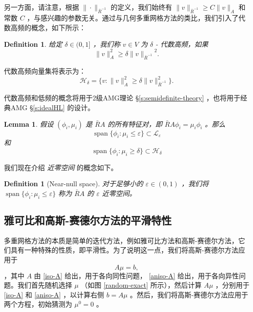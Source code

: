 \documentclass[12pt]{acta_2011xz}
\newcommand{\Tnorm}[1]{\ensuremath{\|#1\|_{\bar R^{-1}}}}
\newcommand{\Span}{\ensuremath{\operatorname{span}}}
\newtheorem{lemma}[theorem]{Lemma}
\newtheorem{definition}[theorem]{Definition}
\begin{document}
另一方面，请注意，根据    $\Tnorm{\cdot}$    的定义，我们始终有    $\Tnorm{v}\ge C\|v\|_A$    和常数    $C$   ，与感兴趣的参数无关。通过与几何多重网格方法的类比，我们引入了代数高频的概念，如下所示：  

   \begin{definition}   \label{def:high-frequencies}    给定    $\delta\in
(0,1]$    ，我们称    $v\in V$    为    $\delta$    - 代数高频，如果
   $$
\|v\|_A^2\ge \delta\Tnorm{v}^2.
$$     \end{definition}    代数高频向量集将表示为：
   \begin{equation}\label{eq:smootherror} \mathcal{H}_{\delta} =\bigg \{ 
        v: \|v\|_A^2\ge\delta\|v\|_{\bar{R}^{-1}}^2\bigg \} .
\end{equation}     

代数高频和低频的概念将用于2级AMG理论   \S       \ref{s:semidefinite-theory}   ，也将用于经典AMG    \S       \ref{s:idealHL}   的设计。  

   \begin{lemma}假设    $(\phi_i, \mu_i)$    是    $\bar
  RA$    的所有特征对，即    $\bar RA\phi_i=\mu_i\phi_i$    。那么
   $$
\Span \{ \phi_i: \mu_i\le \varepsilon \} \subset \mathcal L_\varepsilon
$$    和 
   $$
\Span \{ \phi_i: \mu_i\ge \delta \} \subset \mathcal H_\delta
$$     \end{lemma}     

我们现在介绍  {    \it    近零空间   }  的概念如下。
   \begin{definition}[Near-null space]对于足够小的
   $\varepsilon\in(0,1)$    ，我们将    $\Span \{ \phi_i: \mu_i\le
  \varepsilon \} $    称为    $\bar RA$    的    $\varepsilon$    近零空间。  \end{definition}     

   \subsection{雅可比和高斯-赛德尔方法的平滑特性  }    多重网格方法的本质是简单的迭代方法，例如雅可比方法和高斯-赛德尔方法，它们具有一种特殊的性质，即平滑性。为了说明这一点，我们将高斯-赛德尔方法应用于 
   $$
A\mu=b,
$$    ，其中    $A$    由    \eqref{iso-A}    给出，用于各向同性问题， 
   \eqref{aniso-A}    给出，用于各向异性问题。我们首先随机选择 
   $\mu$    （如图    \ref{random-exact}    所示），然后计算 
   $A\mu$    ，分别用于    \eqref{iso-A}    和    \eqref{aniso-A}    ，以计算右侧    $b=A\mu$    。然后，我们将高斯-赛德尔方法应用于两个方程，初始猜测为    $\mu^0=0$    。  
\end{document}
